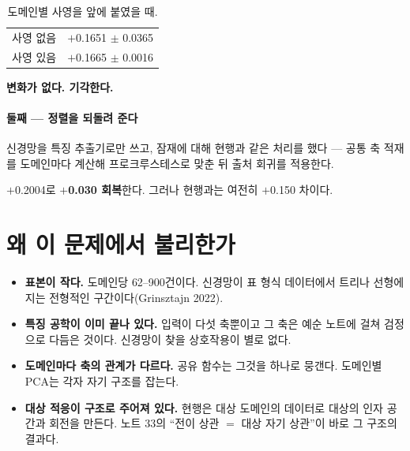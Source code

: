 \documentclass[10pt]{article}
\begin{document}
\begin{table}[t]
\centering\tsize
\caption{도메인별 사영을 앞에 붙였을 때.}
\begin{tabular}{lr}
\toprule
사영 없음 & $+$0.1651 $\pm$ 0.0365 \\
사영 있음 & $+$0.1665 $\pm$ 0.0016 \\
\bottomrule
\end{tabular}
\end{table}

\textbf{변화가 없다. 기각한다.}

\paragraph{둘째 --- 정렬을 되돌려 준다}
신경망을 특징 추출기로만 쓰고, 잠재에 대해 현행과 같은 처리를 했다 --- 공통 축
적재를 도메인마다 계산해 프로크루스테스로 맞춘 뒤 출처 회귀를 적용한다.

$+$0.2004로 \textbf{$+$0.030 회복}한다. 그러나 현행과는 여전히 $+$0.150 차이다.


\section{왜 이 문제에서 불리한가}

\begin{itemize}[leftmargin=1.1em,itemsep=0.2em]
\item \textbf{표본이 작다.} 도메인당 62--900건이다. 신경망이 표 형식 데이터에서
      트리나 선형에 지는 전형적인 구간이다(Grinsztajn 2022).
\item \textbf{특징 공학이 이미 끝나 있다.} 입력이 다섯 축뿐이고 그 축은 예순
      노트에 걸쳐 검정으로 다듬은 것이다. 신경망이 찾을 상호작용이 별로 없다.
\item \textbf{도메인마다 축의 관계가 다르다.} 공유 함수는 그것을 하나로 뭉갠다.
      도메인별 PCA는 각자 자기 구조를 잡는다.
\item \textbf{대상 적응이 구조로 주어져 있다.} 현행은 대상 도메인의 데이터로
      대상의 인자 공간과 회전을 만든다. 노트 33의 ``전이 상관 $=$ 대상 자기
      상관''이 바로 그 구조의 결과다.
\end{itemize}
\end{document}
